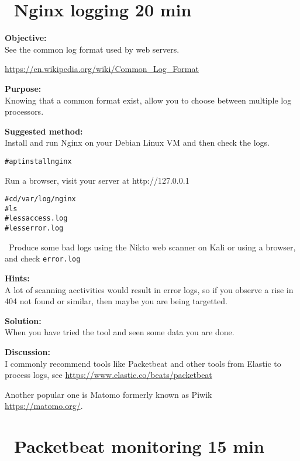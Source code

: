 \documentclass[a4paper,11pt,notitlepage]{report}
\begin{document}
\chapter{\faExclamationTriangle\ Nginx logging  20 min}
\label{ex:nginx-logging}

{\bf Objective:}\\
See the common log format used by web servers.

\url{https://en.wikipedia.org/wiki/Common_Log_Format}


{\bf Purpose:}\\
Knowing that a common format exist, allow you to choose between multiple log processors.


{\bf Suggested method:}\\
Install and run Nginx on your Debian Linux VM and then check the logs.

\begin{alltt}
# apt install nginx
\end{alltt}

Run a browser, visit your server at http://127.0.0.1

\begin{alltt}
# cd /var/log/nginx
# ls
# less access.log
# less error.log
\end{alltt}

\faInfoCircle\
Produce some bad logs using the Nikto web scanner on Kali or using a browser, and check \verb+error.log+


{\bf Hints:}\\
A lot of scanning acctivities would result in error logs, so if you observe a rise in 404 not found or similar, then maybe you are being targetted.

{\bf Solution:}\\
When you have tried the tool and seen some data you are done.

{\bf Discussion:}\\
I commonly recommend tools like Packetbeat and other tools from Elastic to process logs, see \url{https://www.elastic.co/beats/packetbeat}

Another popular one is Matomo formerly known as Piwik\\
\url{https://matomo.org/}.


\chapter{\faInfoCircle\  Packetbeat monitoring 15 min}
\label{ex:packetbeat}
\end{document}
